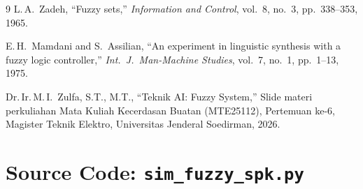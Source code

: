 \documentclass[conference]{IEEEtran}
\begin{document}
\begin{thebibliography}{9}
  L.\,A.\ Zadeh,
  ``Fuzzy sets,''
  \emph{Information and Control}, vol.~8, no.~3, pp.~338--353, 1965.

  E.\,H.\ Mamdani and S.\ Assilian,
  ``An experiment in linguistic synthesis with a fuzzy logic controller,''
  \emph{Int.\ J.\ Man-Machine Studies}, vol.~7, no.~1, pp.~1--13, 1975.

  Dr.\,Ir.\,M.\,I.\ Zulfa, S.T., M.T.,
  ``Teknik AI: Fuzzy System,''
  Slide materi perkuliahan Mata Kuliah Kecerdasan Buatan (MTE25112),
  Pertemuan ke-6, Magister Teknik Elektro,
  Universitas Jenderal Soedirman, 2026.
\end{thebibliography}

\appendices

\section{Source Code: \texttt{sim\_fuzzy\_spk.py}}
\label{app:source}


\end{document}
